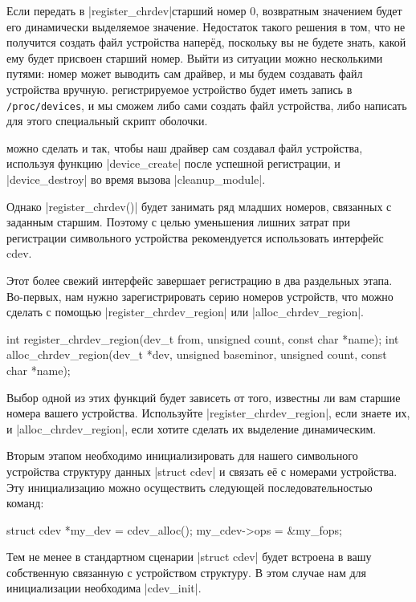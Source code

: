 \documentclass[10pt, oneside]{book}
\begin{document}
Если передать в \cpp|register_chrdev|старший номер 0, возвратным значением будет его динамически выделяемое значение. Недостаток такого решения в том, что не получится создать файл устройства наперёд, поскольку вы не будете знать, какой ему будет присвоен старший номер.
Выйти из ситуации можно несколькими путями:
номер может выводить сам драйвер, и мы будем создавать файл устройства вручную.
регистрируемое устройство будет иметь запись в \verb|/proc/devices|, и мы сможем либо сами создать файл устройства, либо написать для этого специальный скрипт оболочки.

можно сделать и так, чтобы наш драйвер сам создавал файл устройства, используя функцию \cpp|device_create| после успешной регистрации, и \cpp|device_destroy| во время вызова \cpp|cleanup_module|.

Однако \cpp|register_chrdev()| будет занимать ряд младших номеров, связанных с заданным старшим. Поэтому с целью уменьшения лишних затрат при регистрации
символьного устройства рекомендуется использовать интерфейс cdev.

Этот более свежий интерфейс завершает регистрацию в два раздельных этапа. Во-первых, нам нужно зарегистрировать серию номеров устройств, что можно сделать с помощью \cpp|register_chrdev_region| или \cpp|alloc_chrdev_region|.

\begin{code}
int register_chrdev_region(dev_t from, unsigned count, const char *name);
int alloc_chrdev_region(dev_t *dev, unsigned baseminor, unsigned count, const char *name);
\end{code}

Выбор одной из этих функций будет зависеть от того, известны ли вам старшие номера вашего устройства. Используйте \cpp|register_chrdev_region|, если знаете их, и \cpp|alloc_chrdev_region|, если хотите сделать их выделение динамическим.

Вторым этапом необходимо инициализировать для нашего символьного устройства структуру данных \cpp|struct cdev| и связать её с номерами устройства.
Эту инициализацию можно осуществить следующей последовательностью команд:

\begin{code}
struct cdev *my_dev = cdev_alloc();
my_cdev->ops = &my_fops;
\end{code}

Тем не менее в стандартном сценарии \cpp|struct cdev| будет встроена в вашу собственную связанную с устройством структуру. В этом случае нам для инициализации необходима \cpp|cdev_init|.
\end{document}
